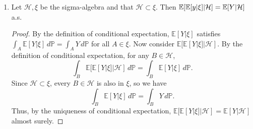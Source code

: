 \documentclass{article}
\begin{document}
\begin{enumerate}
    We will use the following definition - which requires that function c is continuous (6.6.a in Williams): \( c(x)=sup_{q\in G}\left[D_{-c}(q)(x-q)+c(q)\right]=sup_{n}(a_{n}x + b_{n})\) for some sequences in $a_n b_n \in \R$\footnote{The definition expresses \( c(x) \) as the supremum of affine functions \( a_n x + b_n \) for sequences \( a_n \) and \( b_n \), which correspond to the subgradients \( D_{-c}(q_n) \) and values \( c(q_n) \) at points \( q_n \). This means that \( c(x) \) can be constructed as the pointwise upper bound of all linear approximations of the function based on its subgradients at various points. Intuitively, each linear function \( a_n x + b_n \) is a "supporting hyperplane" to the convex function at a specific point, and the supremum ensures that \( c(x) \) is the tightest convex function that satisfies these inequalities.}.

    \begin{proof}
        If we apply this definition to this problem we know that \(c(x)=sup_{n}(a_n x + b_n)\) and \(c(x)\geq (a_n x + b_n)\) for a fixed  $n \in \N$. Then we take expectations in both sides:  \(\E(c(x)|\zeta)\geq (a_n \E(x|\zeta) + b_n)\), where $\zeta \in \sigma(x)$. Then for all n, this is also true by countability property\footnote{The countability property allows the supremum over all \(n \in \mathbb{N}\) to replace the fixed \(n\) case, ensuring the inequality applies to the entire sequence.}
        : \(\E(c(x)|\zeta)\geq sup_n(a_n \E(x|\zeta) + b_n)=c(\E(x|\zeta))\). 
    \end{proof}

    \(\)




    \item Let \(\mathcal{H}, \xi\) be the sigma-algebra and that \(\mathcal{H}\subset \xi\). Then \(\mathbb{E}[\mathbb{E}[y|\xi]|\mathcal{H}]=\mathbb{E}[Y|\mathcal{H}]\) a.s.
    
    \begin{proof}
        By the definition of conditional expectation, \(\mathbb{E}[Y|\xi]\) satisfies \(\int_A \mathbb{E}[Y|\xi] \, d\mathbb{P} = \int_A Y \, d\mathbb{P}\) for all \(A \in \xi\).  
        Now consider \(\mathbb{E}[\mathbb{E}[Y|\xi]|\mathcal{H}]\). By the definition of conditional expectation, for any \(B \in \mathcal{H}\),
        \[
        \int_B \mathbb{E}[\mathbb{E}[Y|\xi]|\mathcal{H}] \, d\mathbb{P} = \int_B \mathbb{E}[Y|\xi] \, d\mathbb{P}.
        \]
        Since \(\mathcal{H} \subset \xi\), every \(B \in \mathcal{H}\) is also in \(\xi\), so we have
        \[
        \int_B \mathbb{E}[Y|\xi] \, d\mathbb{P} = \int_B Y \, d\mathbb{P}.
        \]
        Thus, by the uniqueness of conditional expectation, \(\mathbb{E}[\mathbb{E}[Y|\xi]|\mathcal{H}] = \mathbb{E}[Y|\mathcal{H}]\) almost surely.
        \end{proof}



\end{enumerate}
\end{document}
